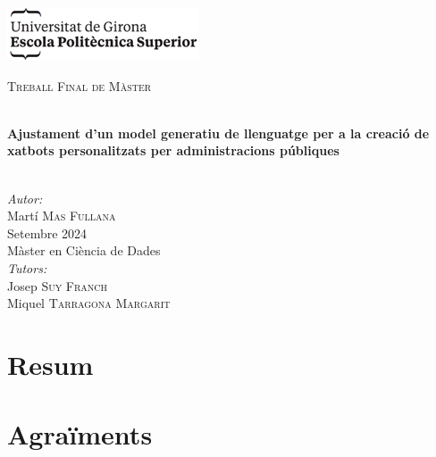 \documentclass[a4paper,12pt,twoside]{ThesisStyle}
\begin{document}
\newpage
\hypersetup{pageanchor=false}
\begin{titlepage}

  \includegraphics[scale=0.9]{imatges/logo_eps.png} \\[1cm]
  \begin{center}
    \textsc{\Large Treball Final de Màster} \\[1cm]

    \begin{spacing}{2}
      \HRule \\
      \textbf{\Huge Ajustament d'un model generatiu de llenguatge per a la creació de xatbots personalitzats per administracions públiques} \\
      \HRule \\[0.5cm]
    \end{spacing}

    {
    \large
    \emph{Autor:} \\
    Martí \textsc{Mas Fullana} \\[1cm]
    Setembre 2024 \\[1cm]
    Màster en Ciència de Dades \\[1cm]
    \emph{Tutors:} \\
    Josep \textsc{Suy Franch} \\
    Miquel \textsc{Tarragona Margarit} \\
    }

  \end{center}
\end{titlepage}
\hypersetup{pageanchor=true}

\titlepage




\chapter*{Resum}



\chapter*{Agraïments}
\end{document}
